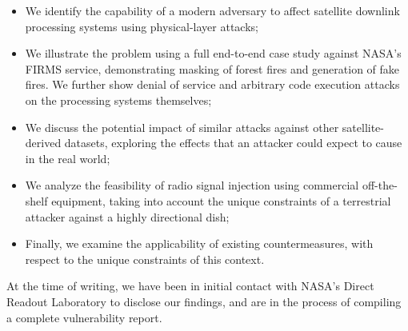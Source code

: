 \begin{itemize}
    \item We identify the capability of a modern adversary to affect satellite downlink processing systems using physical-layer attacks;
    \item We illustrate the problem using a full end-to-end case study against NASA's FIRMS service, demonstrating masking of forest fires and generation of fake fires. We further show denial of service and arbitrary code execution attacks on the processing systems themselves;
    \item We discuss the potential impact of similar attacks against other satellite-derived datasets, exploring the effects that an attacker could expect to cause in the real world;
    \item We analyze the feasibility of radio signal injection using commercial off-the-shelf equipment, taking into account the unique constraints of a terrestrial attacker against a highly directional dish;
    \item Finally, we examine the applicability of existing countermeasures, with respect to the unique constraints of this context.
\end{itemize}

At the time of writing, we have been in initial contact with NASA's Direct Readout Laboratory to disclose our findings, and are in the process of compiling a complete vulnerability report.
